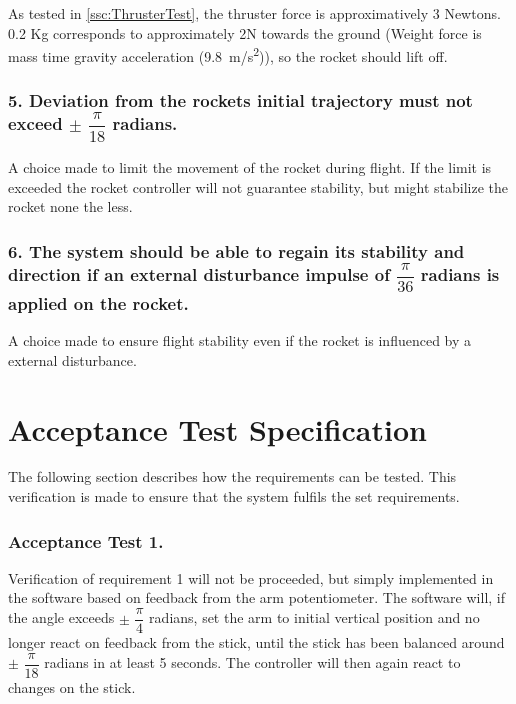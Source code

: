 As tested in \autoref{ssc:ThrusterTest}, the thruster force is approximatively 3 Newtons. 0.2 Kg corresponds to approximately 2N towards the ground (Weight force is mass time gravity acceleration (\SI{9.8}{m/s^2})), so the rocket should lift off.

\subsubsection*{5. Deviation from the rockets initial trajectory must not exceed $\pm$ $\dfrac{\pi}{18}$ radians.} 

\forceindent A choice made to limit the movement of the rocket during flight. If the limit is exceeded the rocket controller will not guarantee stability, but might stabilize the rocket none the less. 

\subsubsection*{6. The system should be able to regain its stability and direction if an external disturbance impulse of $\dfrac{\pi}{36}$ radians is applied on the rocket.} 

\forceindent  A choice made to ensure flight stability even if the rocket is influenced by a external disturbance.

\section{Acceptance Test Specification}	\label{sec:TestDesc}
The following section describes how the requirements can be tested. This verification is made to ensure that the system fulfils the set requirements.

\subsubsection*{Acceptance Test 1.}

\forceindent Verification of requirement 1 will not be proceeded, but simply implemented in the software based on feedback from the arm potentiometer. The software will, if the angle exceeds $\pm$ $\dfrac{\pi}{4}$ radians, set the arm to initial vertical position and no longer react on feedback from the stick, until the stick has been balanced around $\pm$ $\dfrac{\pi}{18}$ radians in at least 5 seconds. The controller will then again react to changes on the stick.    

